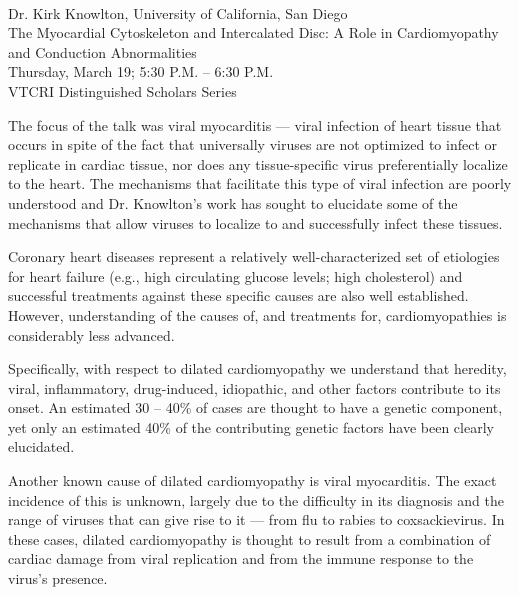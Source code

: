 \documentclass[11pt,letterpaper,final] {article}
\begin{document}

\\
Dr. Kirk Knowlton, University of California, San Diego\\
The Myocardial Cytoskeleton and Intercalated Disc: A Role in Cardiomyopathy and Conduction Abnormalities\\
Thursday, March 19; 5:30 P.M. -- 6:30 P.M.\\
VTCRI Distinguished Scholars Series\\[0.4cm]


The focus of the talk was viral myocarditis --- viral infection of heart tissue that occurs in spite of the fact that universally viruses are not optimized to infect or replicate in cardiac tissue, nor does any tissue-specific virus preferentially localize to the heart. The mechanisms that facilitate this type of viral infection are poorly understood and Dr. Knowlton's work has sought to elucidate some of the mechanisms that allow viruses to localize to and successfully infect these tissues.\\[0.4cm]


Coronary heart diseases represent a relatively well-characterized set of etiologies for heart failure (e.g., high circulating glucose levels; high cholesterol) and successful treatments against these specific causes are also well established. However, understanding of the causes of, and treatments for, cardiomyopathies is considerably less advanced.

Specifically, with respect to dilated cardiomyopathy we understand that heredity, viral, inflammatory, drug-induced, idiopathic, and other factors contribute to its onset. An estimated 30 -- 40\% of cases are thought to have a genetic component, yet only an estimated 40\% of the contributing genetic factors have been clearly elucidated.

Another known cause of dilated cardiomyopathy is viral myocarditis. The exact incidence of this is unknown, largely due to the difficulty in its diagnosis and the range of viruses that can give rise to it --- from flu to rabies to coxsackievirus. In these cases, dilated cardiomyopathy is thought to result from a combination of cardiac damage from viral replication and from the immune response to the virus's presence.
\end{document}
